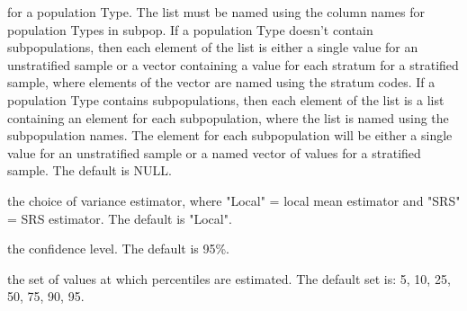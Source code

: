 \begin{Arguments}
\begin{ldescription}
for a population Type.  The list must be named using the column  
names for population Types in subpop.  If a population Type doesn't  
contain subpopulations, then each element of the list is either a  
single value for an unstratified sample or a vector containing a value  
for each stratum for a stratified sample, where elements of the vector
are named using the stratum codes.  If a population Type contains 
subpopulations, then each element of the list is a list containing an 
element for each subpopulation, where the list is named using the 
subpopulation names.  The element for each subpopulation will be 
either a single value for an unstratified sample or a named vector of 
values for a stratified sample.  The default is NULL.
\item[\code{vartype}] the choice of variance estimator, where "Local" = local mean
estimator and "SRS" = SRS estimator.  The default is "Local".
\item[\code{conf}] the confidence level.  The default is 95\%.
\item[\code{pctval}] the set of values at which percentiles are estimated.  The 
default set is: {5, 10, 25, 50, 75, 90, 95}.
\end{ldescription}
\end{Arguments}
